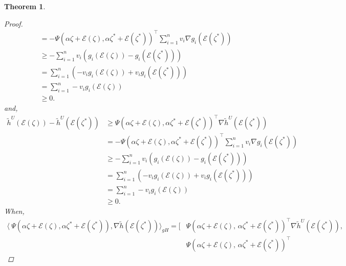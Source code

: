 \documentclass[12pt, reqno]{amsart}
\newtheorem{theorem}{Theorem}[section]
\theoremstyle{definition}
\theoremstyle{remark}
\numberwithin{equation}{section}
\begin{document}
\begin{theorem}
\begin{proof}
\begin{align*}
&= -\Psi(\alpha \mathit{\zeta} +\mathcal{\mathcal{E}}(\mathit{\zeta} ), \alpha \mathit{\zeta} ^*+\mathcal{\mathcal{E}}(\mathit{\zeta} ^*))^{\!\top}\sum_{i=1}^n v_i \nabla g_i(\mathcal{\mathcal{E}}(\mathit{\zeta} ^*)) \\
&\geq -\sum_{i=1}^n v_i \left( g_i(\mathcal{\mathcal{E}}(\mathit{\zeta} )) - g_i(\mathcal{\mathcal{E}}(\mathit{\zeta} ^*)) \right)\\
&= \sum_{i=1}^{n} \left( -v_i g_i(\mathcal{\mathcal{E}}(\mathit{\zeta} )) + v_i g_i(\mathcal{\mathcal{E}}(\mathit{\zeta} ^*)) \right) \\
&= \sum_{i=1}^{n} -v_i g_i(\mathcal{\mathcal{E}}(\mathit{\zeta} )) \\
&\geq 0.
\end{align*}
and,
\begin{align*}
\tilde{h}^U(\mathcal{\mathcal{E}}(\mathit{\zeta} )) - \tilde{h}^U(\mathcal{\mathcal{E}}(\mathit{\zeta} ^*)) &\geq \Psi(\alpha \mathit{\zeta} +\mathcal{\mathcal{E}}(\mathit{\zeta} ),\alpha \mathit{\zeta} ^*+\mathcal{\mathcal{E}}(\mathit{\zeta} ^*))^{\!\top} \nabla\tilde{h}^U(\mathcal{\mathcal{E}}(\mathit{\zeta} ^*))  \\
&= -\Psi(\alpha \mathit{\zeta} +\mathcal{\mathcal{E}}(\mathit{\zeta} ),\alpha \mathit{\zeta} ^*+\mathcal{\mathcal{E}}(\mathit{\zeta} ^*))^{\!\top}\sum_{i=1}^{n} v_i \nabla g_i(\mathcal{\mathcal{E}}(\mathit{\zeta} ^*)) \\
&\geq - \sum_{i=1}^{n} v_i (g_i(\mathcal{\mathcal{E}}(\mathit{\zeta} )) - g_i(\mathcal{\mathcal{E}}(\mathit{\zeta} ^*))) \\
&= \sum_{i=1}^{n} \left( -v_i g_i(\mathcal{\mathcal{E}}(\mathit{\zeta} )) + v_i g_i(\mathcal{\mathcal{E}}(\mathit{\zeta} ^*)) \right) \\
&= \sum_{i=1}^{n} -v_i g_i(\mathcal{\mathcal{E}}(\mathit{\zeta} )) \\
&\geq 0.
    \end{align*}
  When,
\begin{align*}
    \langle\ {\Psi}( {\alpha} \mathit{\zeta} + \mathcal{\mathcal{E}}(\mathit{\zeta} ), {\alpha}\mathit{\zeta^*} + \mathcal{\mathcal{E}}(\mathit{\zeta^*} )),\nabla  \tilde{h}( \mathcal{\mathcal{E}}(\mathit{\zeta^*} ))\rangle_{gH}
    = \big[
    &\Psi(\alpha \mathit{\zeta}  + \mathcal{\mathcal{E}}(\mathit{\zeta} ),\, \alpha \mathit{\zeta^*}  + \mathcal{\mathcal{E}}(\mathit{\zeta^*} ))^{\!\top}
    \nabla \tilde{h}^U(\mathcal{\mathcal{E}}(\mathit{\zeta^*} )), \\
    &\Psi(\alpha \mathit{\zeta}  + \mathcal{\mathcal{E}}(\mathit{\zeta} ),\, \alpha \mathit{\zeta^*}  + \mathcal{\mathcal{E}}(\mathit{\zeta^*} ))^{\!\top}

\end{align*}
\end{proof}
\end{theorem}
\end{document}
